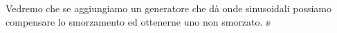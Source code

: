 Vedremo che se aggiungiamo un generatore che dà onde sinusoidali possiamo compensare lo smorzamento ed ottenerne uno non smorzato.
$\ee$
%
%
%
%
%
%

